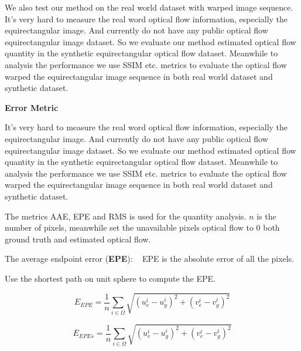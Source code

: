 We also test our method on the real world dataset with warped image sequence.
It's very hard to measure the real word optical flow information, especially the equirectangular image. 
And currently do not have any public optical flow equirectangular image dataset.
So we evaluate our method estimated optical flow quantity in the synthetic equirectangular optical flow dataset.
Meanwhile to analysis the performance we use SSIM etc. metrics to evaluate the optical flow warped the equirectangular image sequence in both real world dataset and synthetic dataset.




\textbf{Error Metric}

It's very hard to measure the real word optical flow information, especially the equirectangular image. 
And currently do not have any public optical flow equirectangular image dataset.
So we evaluate our method estimated optical flow quantity in the synthetic equirectangular optical flow dataset.
Meanwhile to analysis the performance we use SSIM etc. metrics to evaluate the optical flow warped the equirectangular image sequence in both real world dataset and synthetic dataset.

The metrics AAE, EPE and RMS is used for the quantity analysis.
$n$ is the number of pixels, meanwhile set the unavailable pixels optical flow to 0 both ground truth and estimated optical flow.

The average endpoint error (\textbf{EPE}):  ~\cite{BakerSLRBS2011}
EPE is the absolute error of all the pixels.

Use the shortest path on unit sphere to compute the EPE.

\begin{equation}\label{equ_exp_epe}
	E_{EPE} = \frac{1}{n} \sum_{i \in \Omega}\sqrt{(u_e^i - u_g^i)^2 + (v_e^i - v_g^i)^2}
\end{equation}

\begin{equation}\label{equ_exp_epe_sp}
	E_{EPEs} = \frac{1}{n} \sum_{i \in \Omega}\sqrt{(u_e^i - u_g^i)^2 + (v_e^i - v_g^i)^2}
\end{equation}

